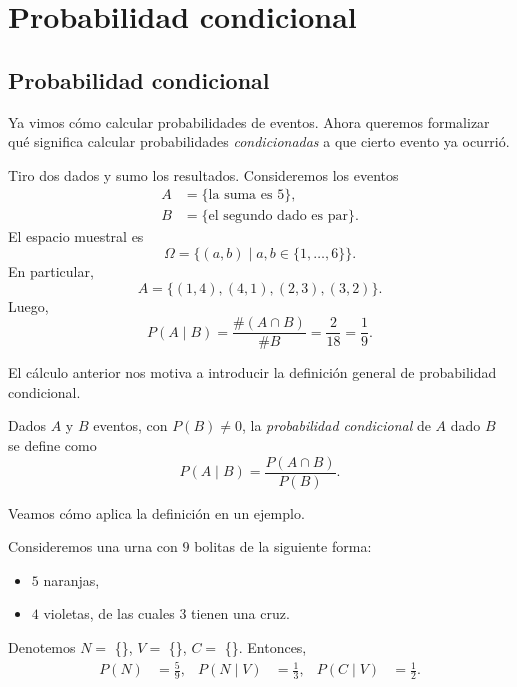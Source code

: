 \chapter{Probabilidad condicional}

\section{Probabilidad condicional}

Ya vimos cómo calcular probabilidades de eventos. Ahora queremos formalizar qué significa calcular probabilidades \textit{condicionadas} a que cierto evento ya ocurrió.

\begin{example}
    Tiro dos dados y sumo los resultados. Consideremos los eventos
    \begin{align*}
        A &= \{\text{la suma es $5$}\}, \\
        B &= \{\text{el segundo dado es par}\}.
    \end{align*}
    El espacio muestral es
    \begin{equation*}
        \Omega = \{(a,b) \mid a,b \in \{1,\ldots,6\}\}.
    \end{equation*}
    En particular,
    \begin{equation*}
        A = \{(1,4),(4,1),(2,3),(3,2)\}.
    \end{equation*}
    Luego,
    \begin{equation*}
        P(A \mid B) = \frac{\# (A \cap B)}{\# B} = \frac{2}{18} = \frac{1}{9}.
    \end{equation*}
\end{example}

El cálculo anterior nos motiva a introducir la definición general de probabilidad condicional.

\begin{definition}
    Dados $A$ y $B$ eventos, con $P(B) \neq 0$, la \emph{probabilidad condicional} de $A$ dado $B$ se define como
    \begin{equation*}
        P(A \mid B) = \frac{P(A \cap B)}{P(B)}.
    \end{equation*}
\end{definition}

Veamos cómo aplica la definición en un ejemplo.

\begin{example}
    Consideremos una urna con $9$ bolitas de la siguiente forma:
    \begin{itemize}
        \item $5$ naranjas,
        \item $4$ violetas, de las cuales $3$ tienen una cruz.
    \end{itemize}
    Denotemos $N=$ \{\}, $V=$ \{\}, $C=$ \{\}. Entonces,
    \begin{align*}
        P(N) &= \frac{5}{9}, &
        P(N \mid V) &= \frac{1}{3}, &
        P(C \mid V) &= \frac{1}{2}.
    \end{align*}
\end{example}

